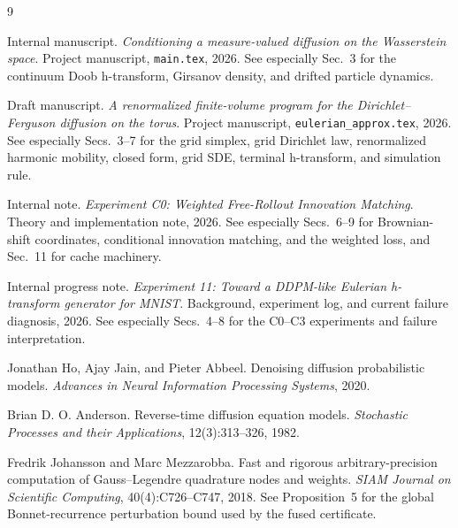 \documentclass[11pt]{article}
\numberwithin{equation}{section}
\newcommand{\1}{\mathbf 1}
\begin{document}
\begin{thebibliography}{9}

Internal manuscript.
\newblock \emph{Conditioning a measure-valued diffusion on the Wasserstein space}.
\newblock Project manuscript, \texttt{main.tex}, 2026.
\newblock See especially Sec.~3 for the continuum Doob h-transform, Girsanov density, and drifted particle dynamics.

Draft manuscript.
\newblock \emph{A renormalized finite-volume program for the Dirichlet--Ferguson diffusion on the torus}.
\newblock Project manuscript, \texttt{eulerian\_approx.tex}, 2026.
\newblock See especially Secs.~3--7 for the grid simplex, grid Dirichlet law, renormalized harmonic mobility, closed form, grid SDE, terminal h-transform, and simulation rule.

Internal note.
\newblock \emph{Experiment C0: Weighted Free-Rollout Innovation Matching}.
\newblock Theory and implementation note, 2026.
\newblock See especially Secs.~6--9 for Brownian-shift coordinates, conditional innovation matching, and the weighted loss, and Sec.~11 for cache machinery.

Internal progress note.
\newblock \emph{Experiment 11: Toward a DDPM-like Eulerian h-transform generator for MNIST}.
\newblock Background, experiment log, and current failure diagnosis, 2026.
\newblock See especially Secs.~4--8 for the C0--C3 experiments and failure interpretation.

Jonathan Ho, Ajay Jain, and Pieter Abbeel.
\newblock Denoising diffusion probabilistic models.
\newblock \emph{Advances in Neural Information Processing Systems}, 2020.

Brian D. O. Anderson.
\newblock Reverse-time diffusion equation models.
\newblock \emph{Stochastic Processes and their Applications}, 12(3):313--326, 1982.

Fredrik Johansson and Marc Mezzarobba.
\newblock Fast and rigorous arbitrary-precision computation of
Gauss--Legendre quadrature nodes and weights.
\newblock \emph{SIAM Journal on Scientific Computing}, 40(4):C726--C747,
2018.
\newblock See Proposition~5 for the global Bonnet-recurrence perturbation
bound used by the fused certificate.

\end{thebibliography}
\end{document}
